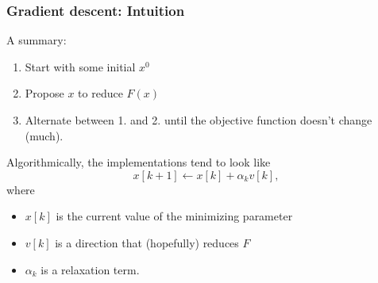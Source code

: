 \documentclass{beamer}
\begin{document}
\begin{frame}
\frametitle{Gradient descent: Intuition}
A summary:
\begin{enumerate}
\item Start with some initial $x^0$
\item Propose $x$ to reduce $F(x)$
\item Alternate between \textcolor{bluemain}{1.} and \textcolor{bluemain}{2.} until the objective function doesn't change (much).
\end{enumerate}

Algorithmically, the implementations tend to look like
\[
x[k+1] \leftarrow x[k] + \alpha_k v[k],
\]
where 
\begin{itemize}
\item $x[k]$ is the current value of the minimizing parameter
\item $v[k]$ is a direction that  (hopefully) reduces $F$
\item $\alpha_k$ is a relaxation term.
\end{itemize}
\end{frame}
%
%
%

%
\end{document}
